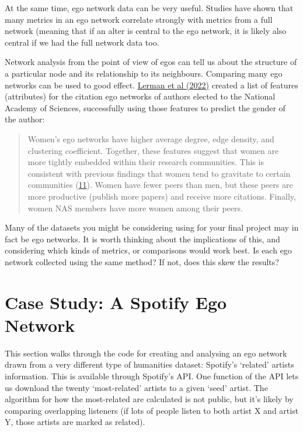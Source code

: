 \documentclass[
]{book}
\begin{document}
At the same time, ego network data can be very useful. Studies have shown that many metrics in an ego network correlate strongly with metrics from a full network (meaning that if an alter is central to the ego network, it is likely also central if we had the full network data too.

Network analysis from the point of view of egos can tell us about the structure of a particular node and its relationship to its neighbours. Comparing many ego networks can be used to good effect. \href{https://www.pnas.org/doi/10.1073/pnas.2206070119}{Lerman et al (2022)} created a list of features (attributes) for the citation ego networks of authors elected to the National Academy of Sciences, successfully using those features to predict the gender of the author:

\begin{quote}
Women's ego networks have higher average degree, edge density, and clustering coefficient. Together, these features suggest that women are more tightly embedded within their research communities. This is consistent with previous findings that women tend to gravitate to certain communities (\href{https://www.pnas.org/doi/10.1073/pnas.2206070119\#core-r11}{11}). Women have fewer peers than men, but these peers are more productive (publish more papers) and receive more citations. Finally, women NAS members have more women among their peers.
\end{quote}

Many of the datasets you might be considering using for your final project may in fact be ego networks. It is worth thinking about the implications of this, and considering which kinds of metrics, or comparisons would work best. Is each ego network collected using the same method? If not, does this skew the results?

\hypertarget{case-study-a-spotify-ego-network}{%
\section{Case Study: A Spotify Ego Network}\label{case-study-a-spotify-ego-network}}

This section walks through the code for creating and analysing an ego network drawn from a very different type of humanities dataset: Spotify's `related' artists information. This is available through Spotify's API. One function of the API lets us download the twenty `most-related' artists to a given `seed' artist. The algorithm for how the most-related are calculated is not public, but it's likely by comparing overlapping listeners (if lots of people listen to both artist X and artist Y, those artists are marked as related).
\end{document}
